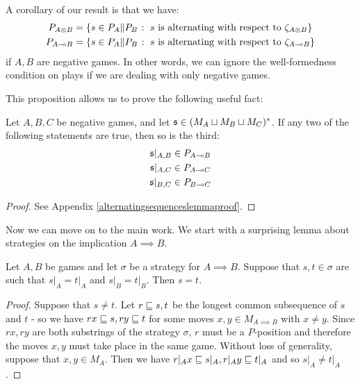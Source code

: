 \documentclass[11pt]{article} %
\begin{document}
A corollary of our result is that we have:
\begin{align*}
  P_{A\otimes B} & = \{s\in P_A\|P_B\;\colon\; \textrm{$s$ is alternating with respect to $\zeta_{A\otimes B}$}\} \\
  P_{A\multimap B} & = \{s\in P_A\|P_B\;\colon\; \textrm{$s$ is alternating with respect to $\zeta_{A\multimap B}$}\}
\end{align*}
if $A,B$ are negative games.  In other words, we can ignore the well-formedness condition on plays if we are dealing with only negative games.

This proposition allows us to prove the following useful fact:

\begin{lemma}
  \label{alternatingsequenceslemma}
  Let $A,B,C$ be negative games, and let $\mathfrak s\in (M_A\sqcup M_B\sqcup M_C)^*$.  If any two of the following statements are true, then so is the third:
  \begin{gather*}
    \mathfrak s\vert_{A,B}\in P_{A\multimap B}\\
    \mathfrak s\vert_{A,C}\in P_{A\multimap C}\\
    \mathfrak s\vert_{B,C}\in P_{B\multimap C}
  \end{gather*}
  \begin{proof}
    See Appendix \ref{alternatingsequenceslemmaproof}.
  \end{proof}
\end{lemma}

Now we can move on to the main work.  We start with a surprising lemma about strategies on the implication $A\implies B$.  

\begin{lemma}
  \label{PlayInStrategyDeterminedByComponents}
  Let $A,B$ be games and let $\sigma$ be a strategy for $A\implies B$.  Suppose that $s,t\in\sigma$ are such that $s\vert_A=t\vert_A$ and $s\vert_B=t\vert_B$.  Then $s=t$.
  \begin{proof}
    Suppose that $s\ne t$.  Let $r\sqsubseteq s,t$ be the longest common subsequence of $s$ and $t$ - so we have $rx\sqsubseteq s, ry\sqsubseteq t$ for some moves $x,y\in M_{A\implies B}$ with $x\ne y$.  Since $rx,ry$ are both substrings of the strategy $\sigma$, $r$ must be a $P$-position and therefore the moves $x,y$ must take place in the same game.  Without loss of generality, suppose that $x,y\in M_A$.  Then we have $r\vert_A x\sqsubseteq s\vert_A,r\vert_Ay\sqsubseteq t\vert_A$ and so $s\vert_A\ne t\vert_A$.
  \end{proof}
\end{lemma}
\end{document}
